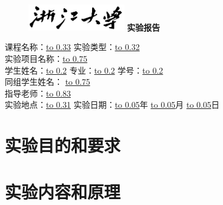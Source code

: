 \documentclass[UTF8,AutoFakeBold,a4paper]{article}  %
\begin{document}
    \thispagestyle{empty}
    \begin{figure}[t]
        \centering
        \includegraphics[width=4.3cm]{figures/zju_subnote.png}
        \textbf{\bfseries\kaishu 实验报告}
    \end{figure}
    \parbox{0.9\linewidth}{
        \fangsong{}\linespread{1.5}
        课程名称：\underline{\hbox to 0.33\linewidth{\hfill 流体力学 \hfill}}
        实验类型：\underline{\hbox to 0.32\linewidth{\hfill 验证性 \hfill}} \\ 
        实验项目名称：\underline{\hbox to 0.75\linewidth{\hfill \hfill}} \\ 
        学生姓名：\underline{\hbox to 0.2\linewidth{\hfill \hfill}}
        专业：\underline{\hbox to 0.2\linewidth{\hfill \hfill}}
        学号：\underline{\hbox to 0.2\linewidth{\hfill \hfill}} \\ 
        同组学生姓名：	\underline{\hbox to 0.75\linewidth{\hfill \hfill}} \\ 		         		
        指导老师：\underline{\hbox to 0.83\linewidth{\hfill \hfill}} \\ 
        实验地点：\underline{\hbox to 0.31\linewidth{\hfill \hfill}}
        实验日期：\underline{\hbox to 0.05\linewidth{\hfill \hfill}}年
        \underline{\hbox to 0.05\linewidth{\hfill \hfill}}月
        \underline{\hbox to 0.05\linewidth{\hfill \hfill}}日
    }
    \section{实验目的和要求}
    \section{实验内容和原理}
\end{document}

